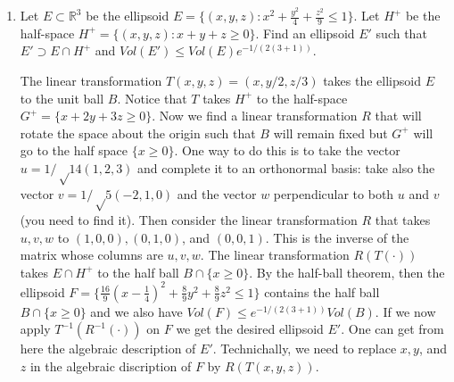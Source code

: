 \documentclass[11pt]{article}
\newcommand{\setR}{\mathbb{R}}
\begin{document}
\begin{enumerate}[1)]
\item Let $E ⊂\setR^3$ be the ellipsoid $E= \{(x,y,z) :x^2 + \frac{y^2}{4} + \frac{z^2}
{9} ≤1\}$.
Let $H^+$ be the half-space $H^+ = \{(x,y,z) : x+ y+ z ≥0\}$.
Find an ellipsoid $E'$ such that $E'⊃E∩H^+$ and $Vol(E') ≤Vol(E)e^{−1/(2(3+1))}$.

\begin{solution}
The linear transformation $T(x,y,z) = (x,y/2, z/3)$ takes the ellipsoid $E$ to the unit ball $B$. Notice that $T$ takes $H^+$ to the half-space
$G^+ = \{x+2y+3z ≥0\}$. Now we find a linear transformation $R$ that will
rotate the space about the origin such that $B$ will remain fixed but $G^+$
will go to the half space $\{x ≥0\}$. One way to do this is to take the vector $u=1/√14 (1,2,3)$ and complete it to an
orthonormal basis: take also the vector $v=1/√5 (−2,1,0)$ and the vector
$w$ perpendicular to both $u$ and $v$ (you need to find it). Then consider
the linear transformation $R$ that takes $u,v,w$ to $(1,0,0),(0,1,0)$, and
$(0,0,1)$. This is the inverse of the matrix whose columns are $u,v,w$.
The linear transformation $R(T(·))$ takes $E∩H^+$ to the half ball $B∩\{x≥
0\}$. By the half-ball theorem, then the ellipsoid
$F= \{\frac{16}{9}(x−\frac{1}{4})^2 + \frac{8}{9} y^2 + \frac{8}{9} z^2 ≤1\}$ contains the half ball $B∩\{x≥0\}$
and we also have $Vol(F) ≤e^{−1/(2(3+1))} Vol(B)$.
If we now apply $T^{−1}(R^{−1}(·))$ on $F$ we get the desired ellipsoid $E'$. One
can get from here the algebraic description of $E'$. Technichally, we need
to replace $x,y$, and $z$ in the algebraic discription of $F$ by $R(T(x,y,z))$.
\end{solution}
  





\end{enumerate}




  
\end{document}
